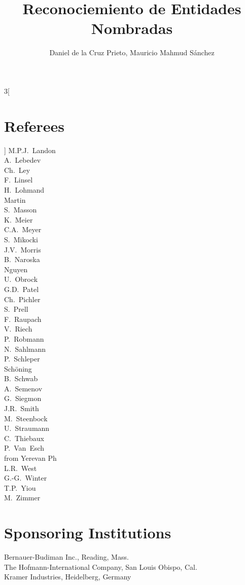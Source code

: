 \documentclass{llncs}
\begin{document}
\begin{multicols}{3}[\section*{Referees}]
		M.P.J.~Landon\\
		A.~Lebedev\\
		Ch.~Ley\\
		F.~Linsel\\
		H.~Lohmand\\
		Martin\\
		S.~Masson\\
		K.~Meier\\
		C.A.~Meyer\\
		S.~Mikocki\\
		J.V.~Morris\\
		B.~Naroska\\
		Nguyen\\
		U.~Obrock\\
		G.D.~Patel\\
		Ch.~Pichler\\
		S.~Prell\\
		F.~Raupach\\
		V.~Riech\\
		P.~Robmann\\
		N.~Sahlmann\\
		P.~Schleper\\
		Sch\"oning\\
		B.~Schwab\\
		A.~Semenov\\
		G.~Siegmon\\
		J.R.~Smith\\
		M.~Steenbock\\
		U.~Straumann\\
		C.~Thiebaux\\
		P.~Van~Esch\\
		from Yerevan Ph\\
		L.R.~West\\
		G.-G.~Winter\\
		T.P.~Yiou\\
		M.~Zimmer\end{multicols}
	\section*{Sponsoring Institutions}
	Bernauer-Budiman Inc., Reading, Mass.\\
	The Hofmann-International Company, San Louis Obispo, Cal.\\
	Kramer Industries, Heidelberg, Germany
	\tableofcontents
	\mainmatter              %
	\title{Reconociemiento de Entidades Nombradas}
	\author{Daniel de la Cruz Prieto, Mauricio Mahmud Sánchez}
\end{document}
